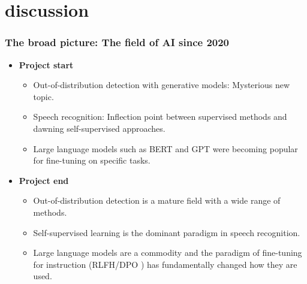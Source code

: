 
\section{discussion}






\begin{frame}
    \frametitle{The broad picture: The field of AI since 2020}
    \begin{itemize}
        \item <1-> [2020] \textbf{Project start}
        \begin{itemize} 
            \item <1-> Out-of-distribution detection with generative models: Mysterious new topic.
            \item <1-> Speech recognition: Inflection point between supervised methods and dawning self-supervised approaches.
            \item <1-> Large language models such as BERT and GPT were becoming popular for fine-tuning on specific tasks.
        \end{itemize}
        \item <2-> [2024] \textbf{Project end}
        \begin{itemize}
            \item <2-> Out-of-distribution detection is a mature field with a wide range of methods.
            \item <2-> Self-supervised learning is the dominant paradigm in speech recognition.
            \item <2-> Large language models are a commodity and the paradigm of fine-tuning for instruction (RLFH/DPO \cite{ouyang_training_2022,rafailov_direct_2024}) has fundamentally changed how they are used.
        \end{itemize}
    \end{itemize}
\end{frame}


